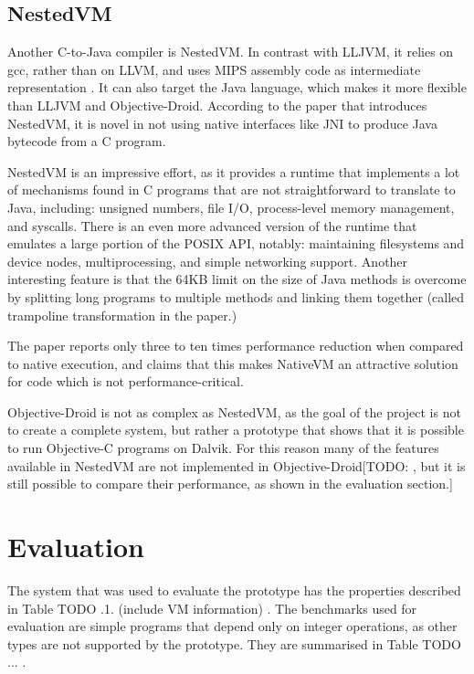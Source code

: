 \documentclass[parskip]{cs4rep}
\begin{document}
\section{NestedVM}

Another C-to-Java compiler is NestedVM. In contrast with LLJVM, it relies on gcc, rather than on LLVM, and uses MIPS assembly code as intermediate representation \cite{AllietMegacz:ivme:2004}. It can also target the Java language, which makes it more flexible than LLJVM and Objective-Droid. According to the paper that introduces NestedVM, it is novel in not using native interfaces like JNI to produce Java bytecode from a C program.

NestedVM is an impressive effort, as it provides a runtime that implements a lot of mechanisms found in C programs that are not straightforward to translate to Java, including: unsigned numbers, file I/O, process-level memory management, and syscalls. There is an even more advanced version of the runtime that emulates a large portion of the POSIX API, notably: maintaining filesystems and device nodes, multiprocessing, and simple networking support. Another interesting feature is that the 64KB limit on the size of Java methods is overcome by splitting long programs to multiple methods and linking them together (called trampoline transformation in the paper.)

The paper reports only three to ten times performance reduction when compared to native execution, and claims that this makes NativeVM an attractive solution for code which is not performance-critical.

Objective-Droid is not as complex as NestedVM, as the goal of the project is not to create a complete system, but rather a prototype that shows that it is possible to run Objective-C programs on Dalvik. For this reason many of the features available in NestedVM are not implemented in Objective-Droid[TODO: , but it is still possible to compare their performance, as shown in the evaluation section.]

\chapter{Evaluation}

The system that was used to evaluate the prototype has the properties described in Table TODO .1. (include VM information) . The benchmarks used for evaluation are simple programs that depend only on integer operations, as other types are not supported by the prototype. They are summarised in Table TODO ... .
\end{document}
